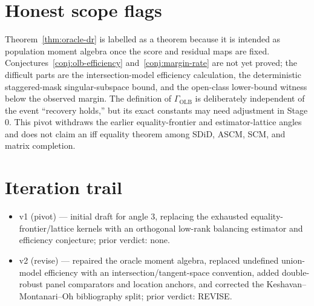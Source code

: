\documentclass[11pt]{article}
\theoremstyle{definition}
\theoremstyle{plain}
\theoremstyle{remark}
\begin{document}
\section{Honest scope flags}
Theorem~\ref{thm:oracle-dr} is labelled as a theorem because it is intended as population moment algebra once the score and residual maps are fixed.  Conjectures~\ref{conj:olb-efficiency} and~\ref{conj:margin-rate} are not yet proved; the difficult parts are the intersection-model efficiency calculation, the deterministic staggered-mask singular-subspace bound, and the open-class lower-bound witness below the observed margin.  The definition of \(\Gamma_{\mathrm{OLB}}\) is deliberately independent of the event ``recovery holds,'' but its exact constants may need adjustment in Stage 0.  This pivot withdraws the earlier equality-frontier and estimator-lattice angles and does not claim an iff equality theorem among SDiD, ASCM, SCM, and matrix completion.

\section{Iteration trail}
\begin{itemize}[leftmargin=*]
\item v1 (pivot) --- initial draft for angle 3, replacing the exhausted equality-frontier/lattice kernels with an orthogonal low-rank balancing estimator and efficiency conjecture; prior verdict: none.
\item v2 (revise) --- repaired the oracle moment algebra, replaced undefined union-model efficiency with an intersection/tangent-space convention, added double-robust panel comparators and location anchors, and corrected the Keshavan--Montanari--Oh bibliography split; prior verdict: REVISE.
\end{itemize}
\end{document}
